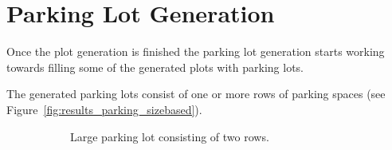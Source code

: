 \section{Parking Lot Generation}

Once the plot generation is finished the parking lot generation starts working towards filling some of the generated plots with parking lots.

The generated parking lots consist of one or more rows of parking spaces (see Figure~\ref{fig:results_parking_sizebased}).

\begin{figure}[H]
   \centering
   \begin{subfigure}[b]{0.485\textwidth}
     \caption{Large parking lot consisting of two rows.}
   \end{subfigure}
   \quad
   \begin{subfigure}[b]{0.45\textwidth}

\end{subfigure}
\end{figure}
